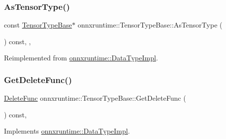 \subsubsection{\texorpdfstring{As\+Tensor\+Type()}{AsTensorType()}}
{\footnotesize\ttfamily const \mbox{\hyperlink{classonnxruntime_1_1TensorTypeBase}{Tensor\+Type\+Base}}$\ast$ onnxruntime\+::\+Tensor\+Type\+Base\+::\+As\+Tensor\+Type (\begin{DoxyParamCaption}{ }\end{DoxyParamCaption}) const\hspace{0.3cm}{\ttfamily [inline]}, {\ttfamily [override]}, {\ttfamily [virtual]}}



Reimplemented from \mbox{\hyperlink{classonnxruntime_1_1DataTypeImpl_ab333e8c93cf88915ad0dbf467efbae1b}{onnxruntime\+::\+Data\+Type\+Impl}}.

\mbox{\label{classonnxruntime_1_1TensorTypeBase_a15a08f55ee78063dd91503a3db044171}} 
\subsubsection{\texorpdfstring{Get\+Delete\+Func()}{GetDeleteFunc()}}
{\footnotesize\ttfamily \mbox{\hyperlink{namespaceonnxruntime_a8dcea0e1aa8476e3d09d5a44a0ca4516}{Delete\+Func}} onnxruntime\+::\+Tensor\+Type\+Base\+::\+Get\+Delete\+Func (\begin{DoxyParamCaption}{ }\end{DoxyParamCaption}) const\hspace{0.3cm}{\ttfamily [override]}, {\ttfamily [virtual]}}



Implements \mbox{\hyperlink{classonnxruntime_1_1DataTypeImpl_affe669c89722b1eb854f31d061a60e46}{onnxruntime\+::\+Data\+Type\+Impl}}.

\mbox{\label{classonnxruntime_1_1TensorTypeBase_a4f3b2fcd0cd32a16607ef39bae0111af}} 

